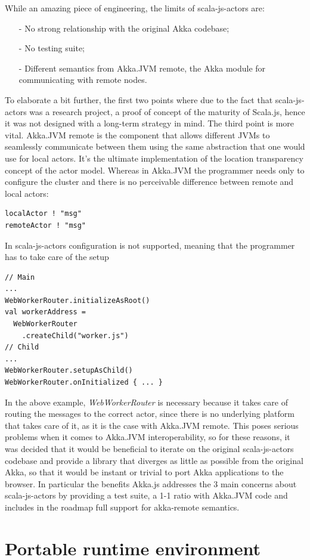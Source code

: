 \documentclass{sig-alternate}
\begin{document}
While an amazing piece of engineering, the limits of scala-js-actors are:
\begin{itemize}
\item[-] No strong relationship with the original Akka codebase;
\item[-] No testing suite;
\item[-] Different semantics from Akka.JVM remote, the Akka module for communicating with remote nodes.
\end{itemize}
To elaborate a bit further, the first two points where due to the fact that scala-js-actors was a research project, a proof of concept of the maturity of Scala.js, hence it was not designed with a long-term strategy in mind.
The third point is more vital. Akka.JVM remote is the component that allows different JVMs to seamlessly communicate between them using the same abstraction that one would use for local actors. It's the ultimate implementation of the location transparency concept of the actor model.
Whereas in Akka.JVM the programmer needs only to configure the cluster and there is no perceivable difference between
remote and local actors:
\begin{lstlisting}
localActor ! "msg"
remoteActor ! "msg"
\end{lstlisting}
In scala-js-actors configuration is not supported, meaning that the programmer has to take care of the setup
\begin{lstlisting}
// Main
...
WebWorkerRouter.initializeAsRoot()
val workerAddress =
  WebWorkerRouter
    .createChild("worker.js")
// Child
...
WebWorkerRouter.setupAsChild()
WebWorkerRouter.onInitialized { ... }
\end{lstlisting}
In the above example, \emph{WebWorkerRouter} is necessary because it takes care of routing the messages to the
correct actor, since there is no underlying platform that takes care of it, as it is the case with Akka.JVM remote.
This poses serious problems when it comes to Akka.JVM interoperability, so for these reasons, it was decided
that it would be beneficial to iterate on the original scala-js-actors codebase and provide a library that
diverges as little as possible from the original Akka, so that it would be instant or trivial to port Akka
applications to the browser.
In particular the benefits Akka.js addresses the 3 main concerns about scala-js-actors by providing a
test suite, a 1-1 ratio with Akka.JVM code and includes in the roadmap full support for akka-remote
semantics.

\section{Portable runtime environment}\label{sec:challenges}
\end{document}
